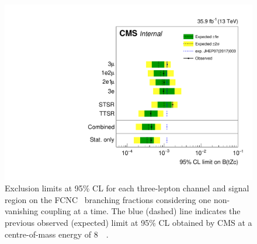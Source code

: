 \begin{figure}[htbp]
	\centering
	\includegraphics[width=1.\linewidth]{6_Search/Figures/TOP-17-017_limitsZctStat.pdf}
	\caption{Exclusion limits at 95\% CL for each three-lepton channel and signal region on the FCNC \Zct\ branching fractions considering one non-vanishing coupling at a time. The blue (dashed) line indicates the previous observed (expected) limit at 95\% CL obtained by CMS at a centre-of-mass energy of 8~\TeV~\cite{Sirunyan:2017kkr}.}	
	\label{fig:exclusionlimitbrcompc}
\end{figure}



